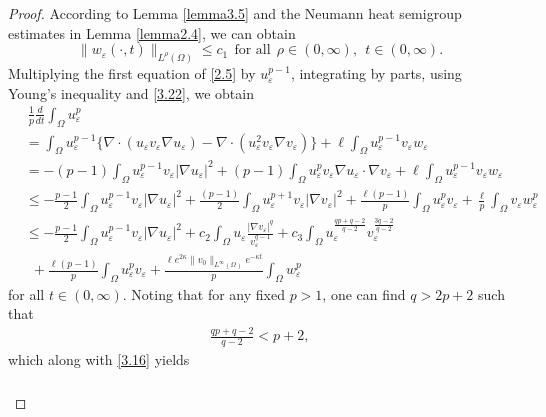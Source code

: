 \documentclass[12pt]{article}
\theoremstyle{plain}
\theoremstyle{definition}
\numberwithin{equation}{section}
\begin{document}
\begin{proof}
According to Lemma \ref{lemma3.5} and the Neumann heat semigroup estimates in Lemma \ref{lemma2.4}, we can obtain
\begin{equation}\label{3.22}
\|w_\varepsilon(\cdot,t)\|_{L^\rho(\Omega)}\leq c_1~~\mbox{for all}~~\rho\in(0,\infty),~~t\in(0,\infty).
\end{equation}
Multiplying the first equation of \eqref{2.5} by $u_\varepsilon^{p-1}$, integrating by parts, using Young's inequality and \eqref{3.22}, we obtain
    \begin{align}\label{3.23}
           &~\frac{1}{p}\frac{d}{dt}\int_\Omega u_\varepsilon^p\nonumber\\
           &=\int_\Omega u_\varepsilon^{p-1}\{\nabla\cdot(u_\varepsilon v_\varepsilon\nabla u_\varepsilon)-\nabla\cdot(u_\varepsilon^2v_\varepsilon\nabla v_\varepsilon)\}+\ell\int_\Omega u_\varepsilon^{p-1} v_\varepsilon w_\varepsilon\nonumber\\
           &=-(p-1)\int_\Omega u_\varepsilon^{p-1}v_\varepsilon|\nabla u_\varepsilon|^2+(p-1)\int_\Omega u_\varepsilon^pv_\varepsilon\nabla u_\varepsilon\cdot\nabla v_\varepsilon+\ell\int_\Omega u_\varepsilon^{p-1} v_\varepsilon w_\varepsilon\nonumber\\
           &\leq-\frac{p-1}{2}\int_\Omega u_\varepsilon^{p-1}v_\varepsilon|\nabla u_\varepsilon|^2+\frac{(p-1)}{2}\int_\Omega u_\varepsilon^{p+1}v_\varepsilon|\nabla v_\varepsilon|^2+\frac{\ell(p-1)}{p}\int_\Omega u_\varepsilon^p v_\varepsilon+\frac{\ell}{p}\int_\Omega v_\varepsilon w_\varepsilon^{p}\\
           &\leq -\frac{p-1}{2}\int_\Omega u_\varepsilon^{p-1}v_\varepsilon|\nabla u_\varepsilon|^2+c_2 \int_{\Omega}u_{\varepsilon}\frac{|\nabla v_{\varepsilon}|^q}{v_{\varepsilon}^{q-1}}+c_3\int_{\Omega}u_{\varepsilon}^{\frac{qp+q-2}{q-2}}v_{\varepsilon}^{\frac{3q-2}{q-2}}\nonumber\\
           &~~+\frac{\ell(p-1)}{p}\int_\Omega u_\varepsilon^p v_\varepsilon+\frac{\ell e^{2\kappa}\|v_0\|_{L^\infty(\Omega)}e^{-\kappa t}}{p}\int_\Omega w_\varepsilon^p\nonumber
    \end{align}
    for all $t\in(0,\infty)$. Noting that for any  fixed $p>1$, one can find $q>2p+2$  such that
\begin{align*}
    \frac{qp+q-2}{q-2}<p+2,
\end{align*}
which along with \eqref{3.16} yields
\begin{align}\label{3.24}
\begin{split}

\end{split}
\end{align}
\end{proof}
\end{document}
